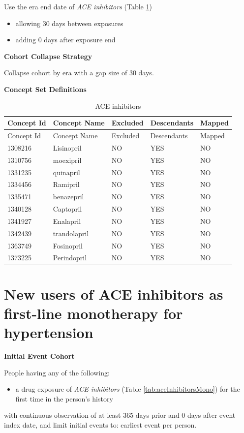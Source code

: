 \documentclass[11pt]{book}
\providecommand{\tightlist}{%
  \setlength{\itemsep}{0pt}\setlength{\parskip}{0pt}}
\theoremstyle{definition}
\theoremstyle{definition}
\theoremstyle{definition}
\theoremstyle{remark}
\begin{document}
Use the era end date of \emph{ACE inhibitors} (Table \ref{tab:aceInhibitors})

\begin{itemize}
\tightlist
\item
  allowing 30 days between exposures
\item
  adding 0 days after exposure end
\end{itemize}

\textbf{Cohort Collapse Strategy}

Collapse cohort by era with a gap size of 30 days.

\textbf{Concept Set Definitions}

\begin{longtable}[]{@{}lllll@{}}
\caption{\label{tab:aceInhibitors} ACE inhibitors}\tabularnewline
\toprule
Concept Id & Concept Name & Excluded & Descendants & Mapped\tabularnewline
\midrule
\endfirsthead
\toprule
Concept Id & Concept Name & Excluded & Descendants & Mapped\tabularnewline
\midrule
\endhead
1308216 & Lisinopril & NO & YES & NO\tabularnewline
1310756 & moexipril & NO & YES & NO\tabularnewline
1331235 & quinapril & NO & YES & NO\tabularnewline
1334456 & Ramipril & NO & YES & NO\tabularnewline
1335471 & benazepril & NO & YES & NO\tabularnewline
1340128 & Captopril & NO & YES & NO\tabularnewline
1341927 & Enalapril & NO & YES & NO\tabularnewline
1342439 & trandolapril & NO & YES & NO\tabularnewline
1363749 & Fosinopril & NO & YES & NO\tabularnewline
1373225 & Perindopril & NO & YES & NO\tabularnewline
\bottomrule
\end{longtable}

\hypertarget{AceInhibitorsMono}{%
\section{New users of ACE inhibitors as first-line monotherapy for hypertension}\label{AceInhibitorsMono}}

\textbf{Initial Event Cohort}

People having any of the following:

\begin{itemize}
\tightlist
\item
  a drug exposure of \emph{ACE inhibitors} (Table \ref{tab:aceInhibitorsMono}) for the first time in the person's history
\end{itemize}

with continuous observation of at least 365 days prior and 0 days after event index date, and limit initial events to: earliest event per person.
\end{document}
